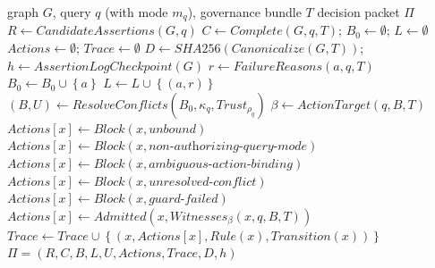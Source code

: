 \documentclass[conference]{IEEEtran}
\newcommand{\set}[1]{\left\{#1\right\}}
\begin{document}
\begin{algorithm}[t]
\caption{Lifecycle-Governed Retrieval}
\label{alg:lgr}
\footnotesize
\begin{algorithmic}[1]
\Require graph $G$, query $q$ (with mode $m_q$), governance bundle $T$
\Ensure decision packet $\Pi$
\State $R\gets CandidateAssertions(G,q)$ 
\State $C\gets Complete(G,q,T)$; $B_0\gets\emptyset$; $L\gets\emptyset$
\State $Actions\gets\emptyset$; $Trace\gets\emptyset$
\State $D\gets SHA256(Canonicalize(G,T))$; $h\gets AssertionLogCheckpoint(G)$
  \State $r\gets FailureReasons(a,q,T)$ 
   $B_0\gets B_0\cup\set{a}$ \Else $L\gets L\cup\set{(a,r)}$ \EndIf
\EndFor
\State $(B,U)\gets ResolveConflicts(B_0,\kappa_q,Trust_{\rho_q})$ 
\State $\beta\gets ActionTarget(q,B,T)$ 
   
    \State $Actions[x]\gets Block(x,\textit{unbound})$
   
    \State $Actions[x]\gets Block(x,\textit{non-authorizing-query-mode})$
   
    \State $Actions[x]\gets Block(x,\textit{ambiguous-action-binding})$
   
    \State $Actions[x]\gets Block(x,\textit{unresolved-conflict})$
   
    \State $Actions[x]\gets Block(x,\textit{guard-failed})$
  \Else
    \State $Actions[x]\gets Admitted(x,Witnesses_\beta(x,q,B,T))$ 
  \EndIf
  \State $Trace\gets Trace\cup\set{(x,Actions[x],Rule(x),Transition(x))}$
\EndFor
\State \Return $\Pi=(R,C,B,L,U,Actions,Trace,D,h)$ 
\end{algorithmic}
\end{algorithm}
\end{document}
